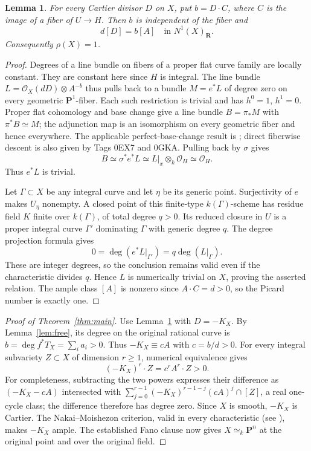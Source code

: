 \documentclass[11pt]{article}
\newtheorem{lemma}[theorem]{Lemma}
\newcommand{\PP}{\mathbf P}
\newcommand{\OO}{\mathcal O}
\begin{document}
\begin{lemma}\label{lem:numerical}
For every Cartier divisor $D$ on $X$, put $b=D\cdot C$, where $C$ is the
image of a fiber of $U\to H$. Then $b$ is independent of the fiber and
\[
 d[D]=b[A]\quad\text{in }N^1(X)_{\mathbf R}.
\]
Consequently $\rho(X)=1$.
\end{lemma}
\begin{proof}
Degrees of a line bundle on fibers of a proper flat curve family are
locally constant. They are constant here since $H$ is integral. The
line bundle $L=\OO_X(dD)\otimes A^{-b}$ thus pulls back to a bundle
$M=e^*L$ of degree zero on every geometric $\PP^1$-fiber. Each such
restriction is trivial and has $h^0=1$, $h^1=0$. Proper flat cohomology
and base change give a line bundle $B=\pi_*M$ with
$\pi^*B\simeq M$; the adjunction map is an isomorphism on every
geometric fiber and hence everywhere. The applicable perfect-base-change
result is \cite[Tag 0B91]{Stacks}; direct fiberwise descent is also
given by Tags 0EX7 and 0GKA. Pulling back by $\sigma$ gives
\[
 B\simeq\sigma^*e^*L\simeq L|_x\otimes_k\OO_H\simeq\OO_H.
\]
Thus $e^*L$ is trivial.

Let $\Gamma\subset X$ be any integral curve and let $\eta$ be its
generic point. Surjectivity of $e$ makes $U_\eta$ nonempty. A closed
point of this finite-type $k(\Gamma)$-scheme has residue field $K$ finite
over $k(\Gamma)$, of total degree $q>0$. Its reduced closure in $U$ is
a proper integral curve $\Gamma'$ dominating $\Gamma$ with generic
degree $q$. The degree projection formula gives
\[
 0=\deg(e^*L|_{\Gamma'})=q\deg(L|_\Gamma).
\]
These are integer degrees, so the conclusion remains valid even if the
characteristic divides $q$. Hence $L$ is numerically trivial on $X$,
proving the asserted relation. The ample class $[A]$ is nonzero since
$A\cdot C=d>0$, so the Picard number is exactly one.
\end{proof}

\begin{proof}[Proof of Theorem~\ref{thm:main}]
Use Lemma~\ref{lem:numerical} with $D=-K_X$. By
Lemma~\ref{lem:free}, its degree on the original rational curve is
$b=\deg f^*T_X=\sum_i a_i>0$. Thus
$-K_X\equiv cA$ with $c=b/d>0$.
For every integral subvariety $Z\subset X$ of dimension $r\geq1$,
numerical equivalence gives
\[
 (-K_X)^r\cdot Z=c^r A^r\cdot Z>0.
\]
For completeness, subtracting the two powers expresses their difference
as $(-K_X-cA)$ intersected with
$\sum_{j=0}^{r-1}(-K_X)^{r-1-j}(cA)^j\cap[Z]$, a real one-cycle class;
the difference therefore has degree zero. Since $X$ is smooth,
$-K_X$ is Cartier. The Nakai--Moishezon criterion, valid in every
characteristic (see \cite[Theorem 1.3]{FujinoMiyamoto}), makes $-K_X$
ample. The established Fano clause \cite[Proposition 4.8(1)]{FM} now
gives $X\simeq_k\PP^n$ at the original point and over the original field.
\end{proof}
\end{document}
